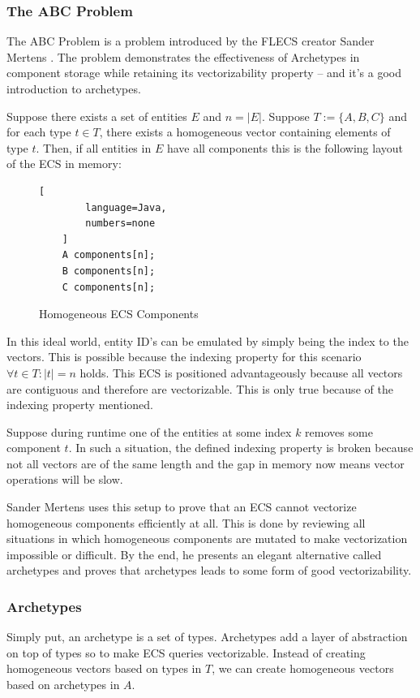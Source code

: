 \subsubsection{The ABC Problem}

The ABC Problem is a problem introduced by the FLECS creator Sander Mertens \cite{SanderMertensECS}. The problem demonstrates the effectiveness of Archetypes in component storage while retaining its vectorizability property -- and it's a good introduction to archetypes.

Suppose there exists a set of entities $E$ and $n = |E|$. Suppose $T := \{A,B,C\}$ and for each type $t \in T$, there exists a homogeneous vector containing elements of type $t$. Then, if all entities in $E$ have all components this is the following layout of the ECS in memory:

\begin{figure}[H]
    \begin{lstlisting}[
        language=Java,
        numbers=none
    ]
    A components[n];
    B components[n];
    C components[n];
    \end{lstlisting}
    \caption{Homogeneous ECS Components}
    \label{code:homogenous_ecs}
\end{figure}

In this ideal world, entity ID's can be emulated by simply being the index to the vectors. This is possible because the indexing property for this scenario $\forall t \in T : |t| = n$ holds. This ECS is positioned advantageously because all vectors are contiguous and therefore are vectorizable. This is only true because of the indexing property mentioned.

Suppose during runtime one of the entities at some index $k$ removes some component $t$. In such a situation, the defined indexing property is broken because not all vectors are of the same length and the gap in memory now means vector operations will be slow.

Sander Mertens uses this setup to prove that an ECS cannot vectorize homogeneous components efficiently at all. This is done by reviewing all situations in which homogeneous components are mutated to make vectorization impossible or difficult. By the end, he presents an elegant alternative called archetypes and proves that archetypes leads to some form of good vectorizability.

\subsubsection{Archetypes}
Simply put, an archetype is a set of types. Archetypes add a layer of abstraction on top of types so to make ECS queries vectorizable. Instead of creating homogeneous vectors based on types in $T$, we can create homogeneous vectors based on archetypes in $A$. 

